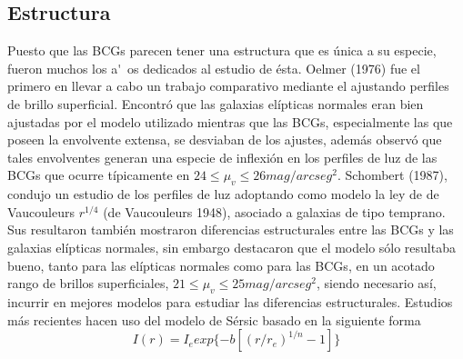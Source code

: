 \subsection{Estructura}
Puesto que las BCGs parecen tener una estructura que es \'unica a su especie,
fueron muchos los a\'~os dedicados al estudio de \'esta. 
Oelmer (1976) fue el primero en llevar a cabo un trabajo comparativo mediante el
ajustando perfiles de brillo superficial. Encontr\'o que las galaxias el\'ipticas normales
eran bien ajustadas por el modelo utilizado mientras que las BCGs, especialmente las que
poseen la envolvente extensa, se desviaban de los ajustes, adem\'as observ\'o que tales envolventes
generan una especie de inflexi\'on en los perfiles de luz de las BCGs que ocurre
t\'ipicamente en $24 \leq \mu_{v} \leq 26 mag/arcseg^{2}$.
Schombert (1987),
condujo un estudio de los perfiles de luz adoptando como modelo la ley de de Vaucouleurs $r^{1/4}$ (de Vaucouleurs 1948),
asociado a galaxias de tipo temprano. Sus resultaron tambi\'en mostraron diferencias estructurales 
entre las BCGs y las galaxias el\'ipticas normales, sin embargo destacaron que el modelo
s\'olo resultaba bueno, tanto para las el\'ipticas normales como para las BCGs, en un acotado rango de brillos superficiales,
$21 \leq \mu_{v} \leq 25 mag/arcseg^{2}$, siendo necesario as\'i, incurrir en mejores modelos para
estudiar las diferencias estructurales.
Estudios m\'as recientes hacen uso del modelo de S\'ersic basado en la siguiente forma
\begin{equation}
 I(r)=I_{e}exp\{ -b[(r/r_{e})^{1/n}-1] \}
\end{equation}

